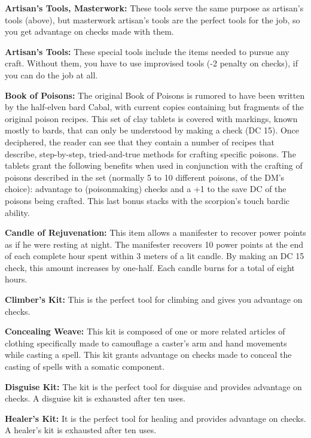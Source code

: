 \textbf{Artisan's Tools, Masterwork:} These tools serve the same purpose as artisan's tools (above), but masterwork artisan's tools are the perfect tools for the job, so you get advantage on  checks made with them.

\textbf{Artisan's Tools:} These special tools include the items needed to pursue any craft. Without them, you have to use improvised tools (-2 penalty on  checks), if you can do the job at all.

\textbf{Book of Poisons:} The original Book of Poisons is rumored to have been written by the half-elven bard Cabal, with current copies containing but fragments of the original poison recipes. This set of clay tablets is covered with markings, known mostly to bards, that can only be understood by making a  check (DC 15). Once deciphered, the reader can see that they contain a number of recipes that describe, step-by-step, tried-and-true methods for crafting specific poisons. The tablets grant the following benefits when used in conjunction with the crafting of poisons described in the set (normally 5 to 10 different poisons, of the DM's choice): advantage to  (poisonmaking) checks and a +1 to the save DC of the poisons being crafted. This last bonus stacks with the scorpion's touch bardic ability.

\textbf{Candle of Rejuvenation:} This item allows a manifester to recover power points as if he were resting at night. The manifester recovers 10 power points at the end of each complete hour spent within 3 meters of a lit candle. By making an  DC 15 check, this amount increases by one-half. Each candle burns for a total of eight hours.

\textbf{Climber's Kit:} This is the perfect tool for climbing and gives you advantage on  checks.

\textbf{Concealing Weave:} This kit is composed of one or more related articles of clothing specifically made to camouflage a caster's arm and hand movements while casting a spell. This kit grants advantage on  checks made to conceal the casting of spells with a somatic component.

\textbf{Disguise Kit:} The kit is the perfect tool for disguise and provides advantage on  checks. A disguise kit is exhausted after ten uses.

\textbf{Healer's Kit:} It is the perfect tool for healing and provides advantage on  checks. A healer's kit is exhausted after ten uses.

